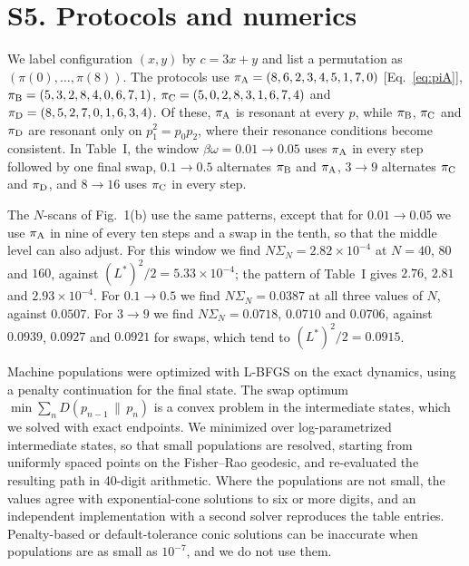\documentclass[aps,prl,reprint,superscriptaddress,amsmath,amssymb]{revtex4-2}
\newcommand{\Dr}[2]{D(#1\,\|\,#2)}
\begin{document}
\section{S5. Protocols and numerics}
We label configuration $(x,y)$ by $c=3x+y$ and list a permutation as $(\pi(0),\dots,\pi(8))$. The protocols use
$\pi_{\rm A}=(8,6,2,3,4,5,1,7,0)$ [Eq.~\eqref{eq:piA}], $\pi_{\rm B}=(5,3,2,8,4,0,6,7,1)$,
$\pi_{\rm C}=(5,0,2,8,3,1,6,7,4)$ and $\pi_{\rm D}=(8,5,2,7,0,1,6,3,4)$. Of these, $\pi_{\rm A}$ is resonant at every
$p$, while $\pi_{\rm B}$, $\pi_{\rm C}$ and $\pi_{\rm D}$ are resonant only on $p_1^2=p_0p_2$, where their resonance
conditions become consistent. In Table~I, the window $\beta\omega=0.01\to0.05$ uses $\pi_{\rm A}$ in every step followed
by one final swap, $0.1\to0.5$ alternates $\pi_{\rm B}$ and $\pi_{\rm A}$, $3\to9$ alternates $\pi_{\rm C}$ and
$\pi_{\rm D}$, and $8\to16$ uses $\pi_{\rm C}$ in every step.

The $N$-scans of Fig.~1(b) use the same patterns, except that for $0.01\to0.05$ we use $\pi_{\rm A}$ in nine of every
ten steps and a swap in the tenth, so that the middle level can also adjust. For this window we find
$N\Sigma_N=2.82\times10^{-4}$ at $N=40$, $80$ and $160$, against $(L^*)^2/2=5.33\times10^{-4}$; the pattern of
Table~I gives $2.76$, $2.81$ and $2.93\times10^{-4}$. For $0.1\to0.5$ we find $N\Sigma_N=0.0387$ at all three values of
$N$, against $0.0507$. For $3\to9$ we find $N\Sigma_N=0.0718$, $0.0710$ and $0.0706$, against $0.0939$, $0.0927$ and
$0.0921$ for swaps, which tend to $(L^*)^2/2=0.0915$.

Machine populations were optimized with L-BFGS on the exact dynamics, using a penalty continuation for the final state.
The swap optimum $\min\sum_n\Dr{p_{n-1}}{p_n}$ is a convex problem in the intermediate states, which we solved with
exact endpoints. We minimized over log-parametrized intermediate states, so that small populations are resolved,
starting from uniformly spaced points on the Fisher--Rao geodesic, and re-evaluated the resulting path in 40-digit
arithmetic. Where the populations are not small, the values agree with exponential-cone solutions to six or more digits,
and an independent implementation with a second solver reproduces the table entries. Penalty-based or default-tolerance
conic solutions can be inaccurate when populations are as small as $10^{-7}$, and we do not use them.
\end{document}
